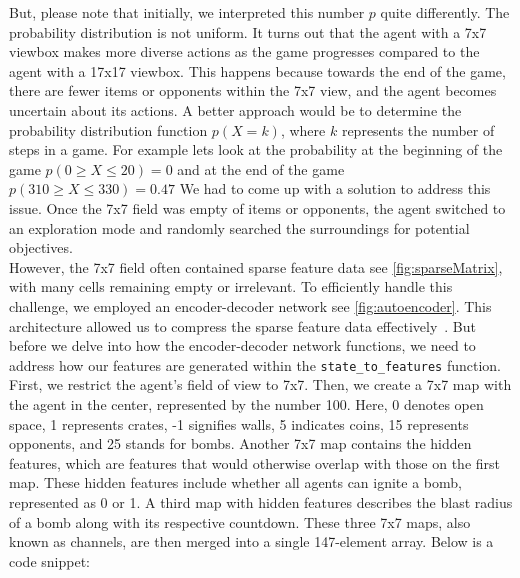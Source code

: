 But, please note that initially, we interpreted this number $p$ quite differently. The probability distribution is not uniform. 
It turns out that the agent with a 7x7 viewbox makes more diverse actions as the game progresses compared to the agent with a 17x17 viewbox. 
This happens because towards the end of the game, there are fewer items or opponents within the 7x7 view, and the agent becomes uncertain about its actions. 
A better approach would be to determine the probability distribution function $p(X = k)$, where $k$ represents the number of steps in a game.
For example lets look at the probability at the beginning of the game $p(0 \geq X \leq 20) = 0$ and at the end of the game $p(310 \geq X \leq 330) = 0.47$
We had to come up with a solution to address this issue. Once the 7x7 field was empty of items or opponents, the agent switched to an exploration mode and randomly 
searched the surroundings for potential objectives.\\

However, the 7x7 field often contained sparse feature data see \autoref{fig:sparseMatrix}, with many cells remaining empty or irrelevant. 
To efficiently handle this challenge, we employed an encoder-decoder network see \autoref{fig:autoencoder}. This architecture allowed us 
to compress the sparse feature data effectively~\cite{Onl:autoencoder}. But before we delve into how the encoder-decoder network functions, we need to address how our 
features are generated within the \verb|state_to_features| function. First, we restrict the agent's field of view to 7x7. Then, we create a 7x7 map 
with the agent in the center, represented by the number 100. Here, 0 denotes open space, 1 represents crates, -1 signifies walls, 5 indicates coins, 15 represents 
opponents, and 25 stands for bombs. Another 7x7 map contains the hidden features, which are features that would otherwise overlap with those on the first map. 
These hidden features include whether all agents can ignite a bomb, represented as 0 or 1. A third map with hidden features describes the blast radius of a 
bomb along with its respective countdown. These three 7x7 maps, also known as channels, are then merged into a 
single 147-element array. Below is a code snippet:

